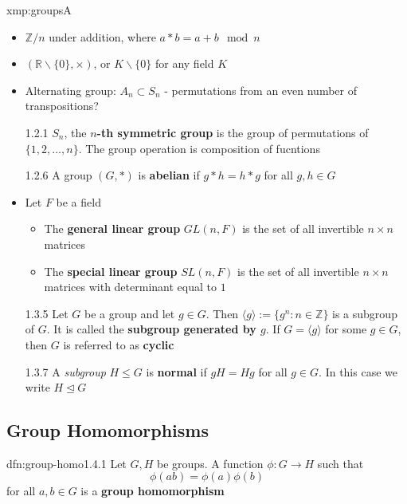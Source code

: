 \documentclass{article}
\begin{document}
\begin{xmp}{xmp:groups}{A}
    \begin{itemize}
        \item $\mathbb{Z} / n$ under addition, where $a * b = a + b \mod n$
        \item $(\mathbb{R} \backslash \{0\}, \times)$, or $K \backslash \{0\}$ for any field $K$
        \item Alternating group: $A_{n} \subset S_{n}$ - permutations from an even number of transpositions?
        \item[1.2.1] $S_{n}$, the \textbf{$n$-th symmetric group} is the group of permutations of $\{1,2,\dots,n\}$. The group operation is composition of fucntions
        \item[1.2.6] A group $(G, *)$ is \textbf{abelian} if $g * h = h * g$ for all $g, h\in G$
        \item Let $F$ be a field
            \begin{itemize}
                \item The \textbf{general linear group} $GL(n, F)$ is the set of all invertible $n \times n$ matrices
                \item The \textbf{special linear group} $SL (n, F)$ is the set of all invertible $n \times n$ matrices with determinant equal to $1$
            \end{itemize}
        \item[1.3.5] Let $G$ be a group and let $g\in G$. Then $\langle g \rangle := \{g^{n} : n\in \mathbb{Z}\}$ is a subgroup of $G$. It is called the \textbf{subgroup generated by $g$}. If $G = \langle g \rangle$ for some $g\in G$, then $G$ is referred to as \textbf{cyclic}
        \item[1.3.7] A \textit{subgroup} $H \le G$ is \textbf{normal} if $gH = Hg$ for all $g\in G$. In this case we write $H \unlhd G$
    \end{itemize}
\end{xmp}


\newpage
\subsection{Group Homomorphisms}

\begin{dfn}{dfn:group-homo}{1.4.1}
    Let $G, H$ be groups. A function $\phi : G \to H$ such that
    \[\phi(ab) = \phi(a)\phi(b)\]
    for all $a, b\in G$ is a \textbf{group homomorphism}
\end{dfn}
\end{document}

